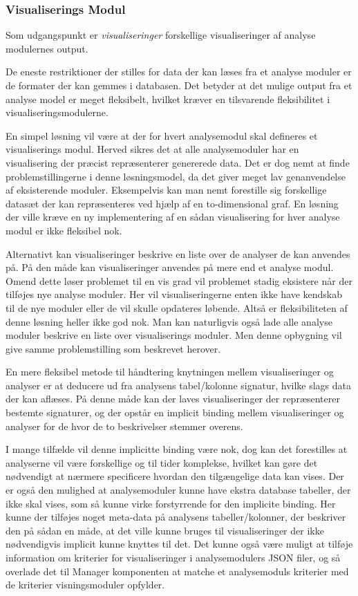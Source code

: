 \subsubsection{Visualiserings Modul}\label{sec:visningsmodul}
Som udgangspunkt er \textit{visualiseringer} forskellige visualiseringer af analyse modulernes output.

De eneste restriktioner der stilles for data der kan læses fra et analyse moduler er de formater der kan gemmes i databasen.
Det betyder at det mulige output fra et analyse model er meget fleksibelt, hvilket kræver en tilsvarende fleksibilitet i visualiseringsmodulerne.

En simpel løsning vil være at der for hvert analysemodul skal defineres et visualiserings modul.
Herved sikres det at alle analysemoduler har en visualisering der præcist repræsenterer genererede data.
Det er dog nemt at finde problemstillingerne i denne løsningsmodel, da det giver meget lav genanvendelse af eksisterende moduler.
Eksempelvis kan man nemt forestille sig forskellige datasæt der kan repræsenteres ved hjælp af en to-dimensional graf.
En løsning der ville kræve en ny implementering af en sådan visualisering for hver analyse modul er ikke fleksibel nok.

Alternativt kan visualiseringer beskrive en liste over de analyser de kan anvendes på.
På den måde kan visualiseringer anvendes på mere end et analyse modul.
Omend dette løser problemet til en vis grad vil problemet stadig eksistere når der tilføjes nye analyse moduler.
Her vil visualiseringerne enten ikke have kendskab til de nye moduler eller de vil skulle opdateres løbende.
Altså er fleksibiliteten af denne løsning heller ikke god nok.
Man kan naturligvis også lade alle analyse moduler beskrive en liste over visualiserings moduler.
Men denne opbygning vil give samme problemstilling som beskrevet herover.

En mere fleksibel metode til håndtering knytningen mellem visualiseringer og analyser er at deducere ud fra analysens tabel/kolonne signatur, hvilke slags data der kan aflæses.
På denne måde kan der laves visualiseringer der repræsenterer bestemte signaturer, og der opstår en implicit binding mellem visualiseringer og analyser for de hvor de to beskrivelser stemmer overens.

I mange tilfælde vil denne implicitte binding være nok, dog kan det forestilles at analyserne vil være forskellige og til tider komplekse, hvilket kan gøre det nødvendigt at nærmere specificere hvordan den tilgængelige data kan vises.
Der er også den mulighed at analysemoduler kunne have ekstra database tabeller, der ikke skal vises, som så kunne virke forstyrrende for den implicite binding.
Her kunne der tilføjes noget meta-data på analysens tabeller/kolonner, der beskriver den på sådan en måde, at det ville kunne bruges til visualiseringer der ikke nødvendigvis implicit kunne knyttes til det.
Det kunne også være muligt at tilføje information om kriterier for visualiseringer i analysemodulers JSON filer, og så overlade det til Manager komponenten at matche et analysemoduls kriterier med de kriterier visningsmoduler opfylder.

